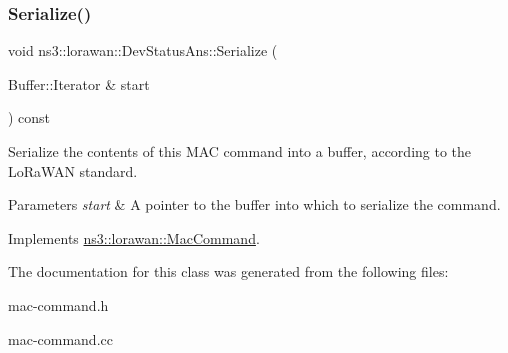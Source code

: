 \subsubsection{\texorpdfstring{Serialize()}{Serialize()}}
{\footnotesize\ttfamily void ns3\+::lorawan\+::\+Dev\+Status\+Ans\+::\+Serialize (\begin{DoxyParamCaption}\item[{Buffer\+::\+Iterator \&}]{start }\end{DoxyParamCaption}) const\hspace{0.3cm}{\ttfamily [virtual]}}

Serialize the contents of this M\+AC command into a buffer, according to the Lo\+Ra\+W\+AN standard.


\begin{DoxyParams}{Parameters}
{\em start} & A pointer to the buffer into which to serialize the command. \\
\hline
\end{DoxyParams}


Implements \hyperlink{classns3_1_1lorawan_1_1MacCommand_a0ed44b33942ddc3dc9694dc06ab0b87f}{ns3\+::lorawan\+::\+Mac\+Command}.



The documentation for this class was generated from the following files\+:\begin{DoxyCompactItemize}
\item 
mac-\/command.\+h\item 
mac-\/command.\+cc\end{DoxyCompactItemize}
